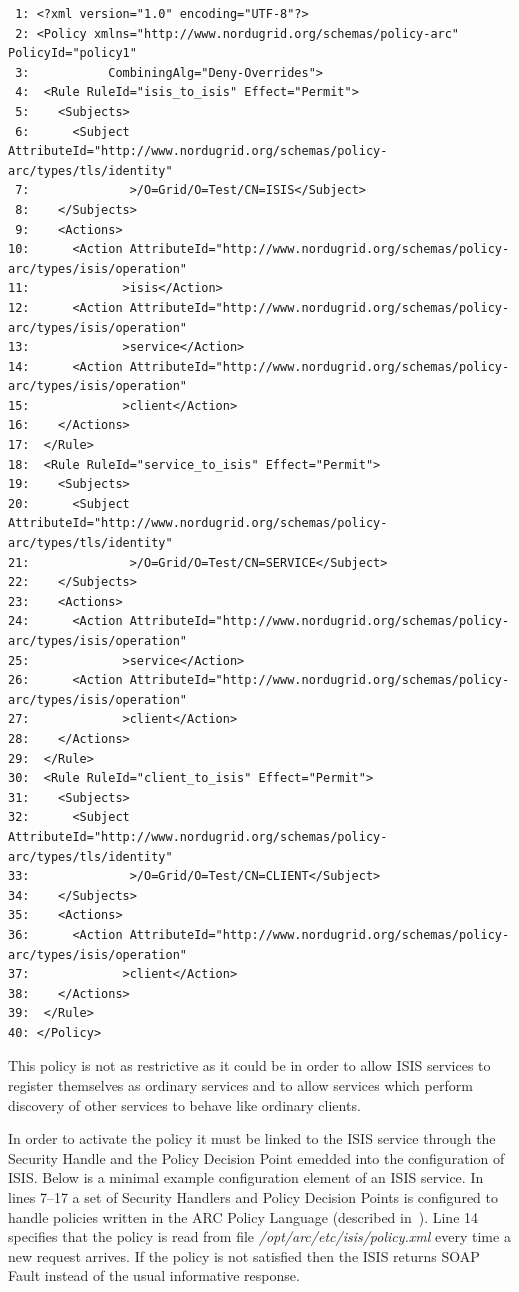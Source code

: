 \documentclass{book}
\begin{document}
\begin{verbatim}
 1: <?xml version="1.0" encoding="UTF-8"?>
 2: <Policy xmlns="http://www.nordugrid.org/schemas/policy-arc" PolicyId="policy1"
 3:           CombiningAlg="Deny-Overrides">
 4:  <Rule RuleId="isis_to_isis" Effect="Permit">
 5:    <Subjects>
 6:      <Subject AttributeId="http://www.nordugrid.org/schemas/policy-arc/types/tls/identity"
 7:              >/O=Grid/O=Test/CN=ISIS</Subject>
 8:    </Subjects>
 9:    <Actions>
10:      <Action AttributeId="http://www.nordugrid.org/schemas/policy-arc/types/isis/operation"
11:             >isis</Action>
12:      <Action AttributeId="http://www.nordugrid.org/schemas/policy-arc/types/isis/operation"
13:             >service</Action>
14:      <Action AttributeId="http://www.nordugrid.org/schemas/policy-arc/types/isis/operation"
15:             >client</Action>
16:    </Actions>
17:  </Rule>
18:  <Rule RuleId="service_to_isis" Effect="Permit">
19:    <Subjects>
20:      <Subject AttributeId="http://www.nordugrid.org/schemas/policy-arc/types/tls/identity"
21:              >/O=Grid/O=Test/CN=SERVICE</Subject>
22:    </Subjects>
23:    <Actions>
24:      <Action AttributeId="http://www.nordugrid.org/schemas/policy-arc/types/isis/operation"
25:             >service</Action>
26:      <Action AttributeId="http://www.nordugrid.org/schemas/policy-arc/types/isis/operation"
27:             >client</Action>
28:    </Actions>
29:  </Rule>
30:  <Rule RuleId="client_to_isis" Effect="Permit">
31:    <Subjects>
32:      <Subject AttributeId="http://www.nordugrid.org/schemas/policy-arc/types/tls/identity"
33:              >/O=Grid/O=Test/CN=CLIENT</Subject>
34:    </Subjects>
35:    <Actions>
36:      <Action AttributeId="http://www.nordugrid.org/schemas/policy-arc/types/isis/operation"
37:             >client</Action>
38:    </Actions>
39:  </Rule>
40: </Policy>

\end{verbatim}

This policy is not as restrictive as it could be in order to allow ISIS services to register themselves as ordinary 
services and to allow services which perform discovery of other services to behave like ordinary clients.

In order to activate the policy it must be linked to the ISIS service through the Security Handle and the Policy 
Decision Point emedded into the configuration of ISIS. Below is a minimal example configuration element of 
an ISIS service. In lines 7--17 a set of Security Handlers and Policy Decision Points is configured to handle
policies written in the ARC Policy Language (described in~\cite{arc1-security}). Line 14 specifies that the policy is
read from file \textit{/opt/arc/etc/isis/policy.xml} every time a new request arrives. If the policy is not 
satisfied then the ISIS returns SOAP Fault instead of the usual informative response.
\end{document}
